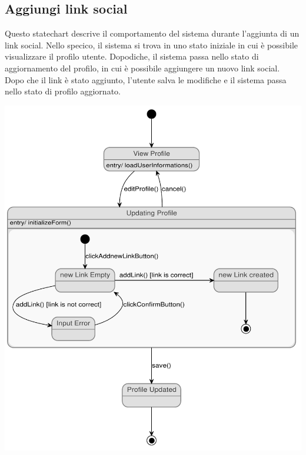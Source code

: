 \subsection{Aggiungi link social}
Questo statechart descrive il comportamento del sistema durante l'aggiunta di un link social. Nello specico, il sistema si trova in uno stato iniziale in cui è possibile visualizzare il profilo utente.
Dopodiche, il sistema passa nello stato di aggiornamento del profilo, in cui è possibile aggiungere un nuovo link social.
Dopo che il link è stato aggiunto, l'utente salva le modifiche e il sistema passa nello stato di profilo aggiornato.
\begin{center}
	\includegraphics[width=.75\textwidth]{assets/state_charts/aggiungi_link_social.pdf}
\end{center}
\newpage

